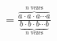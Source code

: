 \documentclass[preview]{standalone}
\begin{document}
\begin{align*}
=\frac{\overbrace{a\cdot a\cdot a\cdots a}^{n \text{ vezes}}}{\underbrace{b\cdot b\cdot b \cdots b}_{n \text{ vezes}}}
\end{align*}
\end{document}
